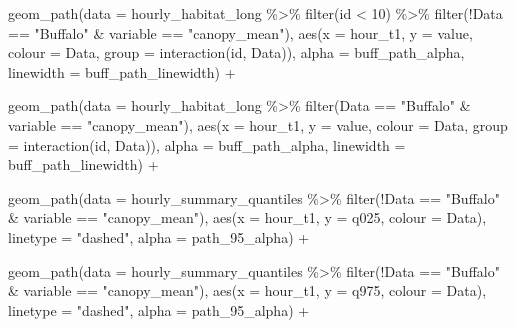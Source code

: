 \documentclass[
  letterpaper,
  DIV=11,
  numbers=noendperiod]{scrartcl}
\newenvironment{Shaded}{\begin{snugshade}}{\end{snugshade}}
\newcommand{\AttributeTok}[1]{\textcolor[rgb]{0.40,0.45,0.13}{#1}}
\newcommand{\DecValTok}[1]{\textcolor[rgb]{0.68,0.00,0.00}{#1}}
\newcommand{\FunctionTok}[1]{\textcolor[rgb]{0.28,0.35,0.67}{#1}}
\newcommand{\NormalTok}[1]{\textcolor[rgb]{0.00,0.23,0.31}{#1}}
\newcommand{\SpecialCharTok}[1]{\textcolor[rgb]{0.37,0.37,0.37}{#1}}
\newcommand{\StringTok}[1]{\textcolor[rgb]{0.13,0.47,0.30}{#1}}
\begin{document}
\begin{Shaded}
\begin{Highlighting}[]
  \FunctionTok{geom\_path}\NormalTok{(}\AttributeTok{data =}\NormalTok{ hourly\_habitat\_long }\SpecialCharTok{\%\textgreater{}\%} \FunctionTok{filter}\NormalTok{(id }\SpecialCharTok{\textless{}} \DecValTok{10}\NormalTok{) }\SpecialCharTok{\%\textgreater{}\%} 
              \FunctionTok{filter}\NormalTok{(}\SpecialCharTok{!}\NormalTok{Data }\SpecialCharTok{==} \StringTok{"Buffalo"} \SpecialCharTok{\&}\NormalTok{ variable }\SpecialCharTok{==} \StringTok{"canopy\_mean"}\NormalTok{),}
                 \FunctionTok{aes}\NormalTok{(}\AttributeTok{x =}\NormalTok{ hour\_t1, }\AttributeTok{y =}\NormalTok{ value, }\AttributeTok{colour =}\NormalTok{ Data, }\AttributeTok{group =} \FunctionTok{interaction}\NormalTok{(id, Data)),}
                 \AttributeTok{alpha =}\NormalTok{ buff\_path\_alpha,}
              \AttributeTok{linewidth =}\NormalTok{ buff\_path\_linewidth) }\SpecialCharTok{+}
  
  \FunctionTok{geom\_path}\NormalTok{(}\AttributeTok{data =}\NormalTok{ hourly\_habitat\_long }\SpecialCharTok{\%\textgreater{}\%} 
              \FunctionTok{filter}\NormalTok{(Data }\SpecialCharTok{==} \StringTok{"Buffalo"} \SpecialCharTok{\&}\NormalTok{ variable }\SpecialCharTok{==} \StringTok{"canopy\_mean"}\NormalTok{), }
                 \FunctionTok{aes}\NormalTok{(}\AttributeTok{x =}\NormalTok{ hour\_t1, }\AttributeTok{y =}\NormalTok{ value, }\AttributeTok{colour =}\NormalTok{ Data, }\AttributeTok{group =} \FunctionTok{interaction}\NormalTok{(id, Data)), }
                 \AttributeTok{alpha =}\NormalTok{ buff\_path\_alpha,}
              \AttributeTok{linewidth =}\NormalTok{ buff\_path\_linewidth) }\SpecialCharTok{+}

  \FunctionTok{geom\_path}\NormalTok{(}\AttributeTok{data =}\NormalTok{ hourly\_summary\_quantiles }\SpecialCharTok{\%\textgreater{}\%} 
              \FunctionTok{filter}\NormalTok{(}\SpecialCharTok{!}\NormalTok{Data }\SpecialCharTok{==} \StringTok{"Buffalo"} \SpecialCharTok{\&}\NormalTok{ variable }\SpecialCharTok{==} \StringTok{"canopy\_mean"}\NormalTok{),}
              \FunctionTok{aes}\NormalTok{(}\AttributeTok{x =}\NormalTok{ hour\_t1, }\AttributeTok{y =}\NormalTok{ q025, }\AttributeTok{colour =}\NormalTok{ Data),}
            \AttributeTok{linetype =} \StringTok{"dashed"}\NormalTok{,}
              \AttributeTok{alpha =}\NormalTok{ path\_95\_alpha) }\SpecialCharTok{+}

  \FunctionTok{geom\_path}\NormalTok{(}\AttributeTok{data =}\NormalTok{ hourly\_summary\_quantiles }\SpecialCharTok{\%\textgreater{}\%} 
              \FunctionTok{filter}\NormalTok{(}\SpecialCharTok{!}\NormalTok{Data }\SpecialCharTok{==} \StringTok{"Buffalo"} \SpecialCharTok{\&}\NormalTok{ variable }\SpecialCharTok{==} \StringTok{"canopy\_mean"}\NormalTok{),}
              \FunctionTok{aes}\NormalTok{(}\AttributeTok{x =}\NormalTok{ hour\_t1, }\AttributeTok{y =}\NormalTok{ q975, }\AttributeTok{colour =}\NormalTok{ Data),}
            \AttributeTok{linetype =} \StringTok{"dashed"}\NormalTok{,}
              \AttributeTok{alpha =}\NormalTok{ path\_95\_alpha) }\SpecialCharTok{+}
  

\end{Highlighting}
\end{Shaded}
\end{document}
